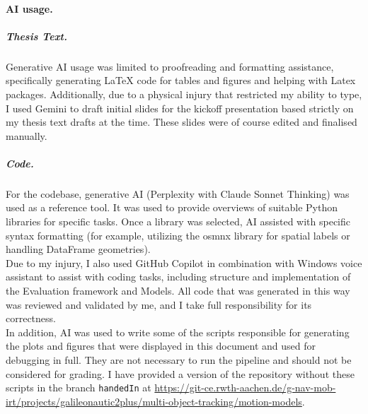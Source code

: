 \paragraph{AI usage.}
\subparagraph{Thesis Text.}
Generative AI usage was limited to proofreading and formatting assistance, specifically generating LaTeX code for tables and figures and helping with Latex  packages. Additionally, due to a  physical injury that restricted my ability to type, I used Gemini to draft initial slides for the kickoff presentation based strictly on my thesis text drafts at the time. These slides were of course edited and finalised manually. 

\subparagraph{Code.}
 For the codebase, generative AI (Perplexity with Claude Sonnet Thinking) was used as a reference tool. It was used to provide overviews of suitable Python libraries for specific tasks. Once a library was selected, AI assisted with specific syntax formatting (for example, utilizing the osmnx library for spatial labels  or handling DataFrame geometries).\\
Due to my injury, I also used GitHub Copilot in combination with Windows voice assistant to assist with coding tasks, including structure and implementation of the Evaluation framework and Models. All code that was generated in this way was reviewed and validated by me, and I take full responsibility for its correctness.\\
 In addition, AI was used to write some of the scripts responsible for generating the plots and figures that were displayed in this document and used for debugging in full. They are not necessary to run the pipeline and should not be considered for grading. I have provided a version of the repository without these scripts in the branch \texttt{handedIn}  at \url{https://git-ce.rwth-aachen.de/g-nav-mob-irt/projects/galileonautic2plus/multi-object-tracking/motion-models}.
